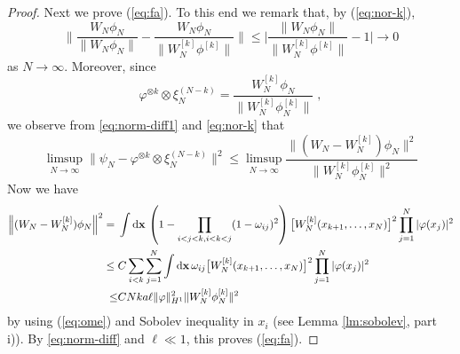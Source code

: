 \documentclass[11pt]{article}
\newcommand{\rd}{{\rm d}}
\newcommand{\bx}{{\bf x}}
\newcommand{\ph}{\varphi}
\begin{document}
\begin{proof}
Next we prove (\ref{eq:fa}). To this end we
remark that, by (\ref{eq:nor-k}),
\begin{equation}\label{eq:norm-diff1}
\Big\| \frac{W_N \phi_N}{\| W_N \phi_N\|} - \frac{W_N \phi_N}{\|
W_N^{[k]} \phi^{[k]}\|} \Big\| \leq \Big| \frac{\| W_N
\phi_N\|}{\|W_N^{[k]} \phi^{[k]}\|} -1 \Big| \to 0
\end{equation}
as $N \to \infty$. Moreover, since
\[ \ph^{\otimes k} \otimes \xi^{(N-k)}_N = \frac{W_N^{[k]}
\phi_N}{\| W_N^{[k]} \phi_N^{[k]} \|}\; , \]
we observe from \eqref{eq:norm-diff1} and \eqref{eq:nor-k} that
\begin{equation}\label{eq:norm-diff}
\limsup_{N\to\infty} \|\psi_N -  \ph^{\otimes k} \otimes
\xi^{(N-k)}_N \|^2 \leq \limsup_{N\to\infty} \frac{\Big\| (W_N -
W_N^{[k]})\phi_N \Big\|^2}{  \| W_N^{[k]} \phi_N^{[k]} \|^2}
\end{equation}
Now we have
\begin{equation*}
\begin{split}
\Big\| (W_N - W_N^{[k]})\phi_N \Big\|^2 = \; & \int \rd \bx \,
\left(1- \prod_{i<j<k, i<k<j} (1-\omega_{ij})^2 \right) \big[ W_N^{[k]}
(x_{k+1}, \dots ,x_N) \big]^2\prod_{j=1}^N |\ph (x_j)|^2
\\ \leq \; &C \sum_{i<k} \sum_{j=1}^N \int \rd \bx \,
\omega_{ij}\big[ W_N^{[k]} (x_{k+1}, \dots,x_N) \big]^2\prod_{j=1}^N |\ph (x_j)|^2 \\
\leq &C N k a \ell \| \ph \|_{H^1}^2 \| W_N^{[k]} \phi^{[k]}_N \|^2
\end{split}
\end{equation*}
by using (\ref{eq:ome}) and Sobolev inequality in $x_i$ (see Lemma
\ref{lm:sobolev}, part i)). By \eqref{eq:norm-diff} and $\ell\ll 1$,
this proves (\ref{eq:fa}).

\medskip


\end{proof}
\end{document}
